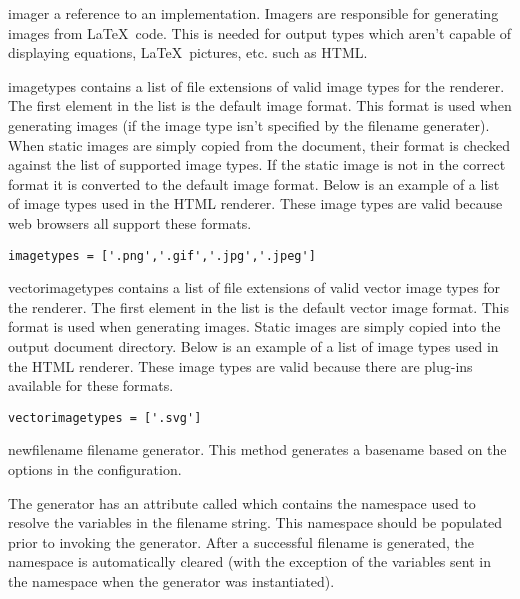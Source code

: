 \begin{memberdesc}[Renderer]{imager}
a reference to an  implementation.  Imagers are responsible
for generating images from \LaTeX\ code.  This is needed for output types 
which aren't capable of displaying equations, \LaTeX\ pictures, etc. such
as HTML.
\end{memberdesc}

\begin{memberdesc}[Renderer]{imagetypes}
contains a list of file extensions of valid image types for the renderer.
The first element in the list is the default image format.  This format
is used when generating images (if the image type isn't specified by
the filename generater).  When static images are simply copied from
the document, their format is checked against the list of supported image
types.  If the static image is not in the correct format it is converted
to the default image format.  Below is an example of a list of image
types used in the HTML renderer.  These image types are valid because 
web browsers all support these formats.
\begin{verbatim}
imagetypes = ['.png','.gif','.jpg','.jpeg']
\end{verbatim}
\end{memberdesc}

\begin{memberdesc}[Renderer]{vectorimagetypes}
contains a list of file extensions of valid vector image types for the
renderer.  The first element in the list is the default vector image 
format.  This format is used when generating images.  Static images
are simply copied into the output document directory.  Below is an
example of a list of image types used in the HTML renderer.  These
image types are valid because there are plug-ins available for these
formats.
\begin{verbatim}
vectorimagetypes = ['.svg']
\end{verbatim}
\end{memberdesc}

\begin{memberdesc}[Renderer]{newfilename}
filename generator.  This method generates a basename based on the options
in the configuration.  

The generator has an attribute called  which contains the
namespace used to resolve the variables in the filename string.  This
namespace should be populated prior to invoking the generator.  After
a successful filename is generated, the namespace is automatically cleared
(with the exception of the variables sent in the namespace when the 
generator was instantiated).

\end{memberdesc}


